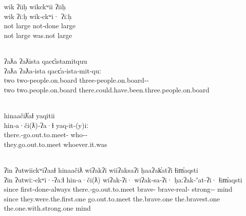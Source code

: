 \begin{exe}
  \glllll wik ʔiiḥ wikckʷii ʔiiḥ\\
          wik           ʔiːḥ           wik‑ckʷi·          ʔiːḥ\\
          not           large          not‑done           large\\
          not           large          was.not            large\\
                               \\
          \vfix

  \glllll ʔaƛa ʔaƛista   qacc̓istamitquu\\
          ʔaƛa           ʔaƛa‑ista           qacc̓a‑ista‑mit‑quː\\
          two            two‑people.on.board three‑people.on.board‑‑\\
          two            two.people.on.board there.could.have.been.three.people.on.board\\
                            \\
          \vfix

  \glllll hinaačiƛ̓aɬ                  yaqitii\\
          hin‑a·či(ƛ)‑ʔa·ɬ                      yaq‑it‑(y)iː\\
          there.‑go.out.to.meet‑ who‑‑\\
          they.go.out.to.meet                   whoever.it.was\\
                                       { }\\
          \vfix

  \clearpage

  \glllll ʔin ʔutwiickʷiʔaaɬ hinaačiƛ            wiʔakʔi wiiʔaksaʔi ḥaaʔak̓atʔi      ɬim̓aqsti\\
          ʔin           ʔutwiː‑ckʷi·‑ʔaːɬ        hin‑a·či(ƛ)                   wiʔak‑ʔi·         wiʔak‑sa‑ʔi·         ḥaːʔak‑ʼat‑ʔi·            ɬim̓aqsti\\
          since         first‑done‑always        there.‑go.out.to.meet brave‑    brave‑real‑  strong‑‑ mind\\
          since         they.were.the.first.one  go.out.to.meet                the.brave.one     the.bravest.one      the.one.with.strong.one   mind\\
          { }                                                                                         \\
          \vfix


\end{exe}
